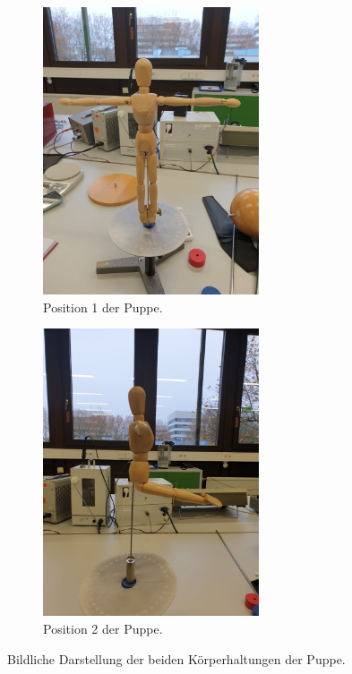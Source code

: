 \begin{figure}
    \centering
    \begin{subfigure}{0.5\textwidth}
      \begin{center}
      \includegraphics[width=0.7\textwidth]{Position_1.jpeg}
      \caption{Position 1 der Puppe.}
      \label{fig:sub1}
      \end{center}
    \end{subfigure}%
    \begin{subfigure}{0.5\textwidth}
      \begin{center}
      \includegraphics[width=0.7\textwidth]{Position_2.jpg}
      \caption{Position 2 der Puppe.}
      \label{fig:sub2}
      \end{center}
    \end{subfigure}
    \caption{Bildliche Darstellung der beiden Körperhaltungen der Puppe.}
    \label{fig:BilderPuppe}
\end{figure}